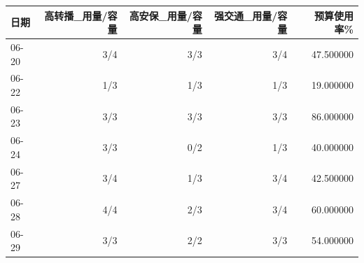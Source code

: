 \begin{tabular}{lrrrr}
\toprule
日期 & 高转播\_用量/容量 & 高安保\_用量/容量 & 强交通\_用量/容量 & 预算使用率\% \\
\midrule
06-20 & 3/4 & 3/3 & 3/4 & 47.500000 \\
06-22 & 1/3 & 1/3 & 1/3 & 19.000000 \\
06-23 & 3/3 & 3/3 & 3/3 & 86.000000 \\
06-24 & 3/3 & 0/2 & 1/3 & 40.000000 \\
06-27 & 3/4 & 1/3 & 3/4 & 42.500000 \\
06-28 & 4/4 & 2/3 & 3/4 & 60.000000 \\
06-29 & 3/3 & 2/2 & 3/3 & 54.000000 \\
\bottomrule
\end{tabular}
